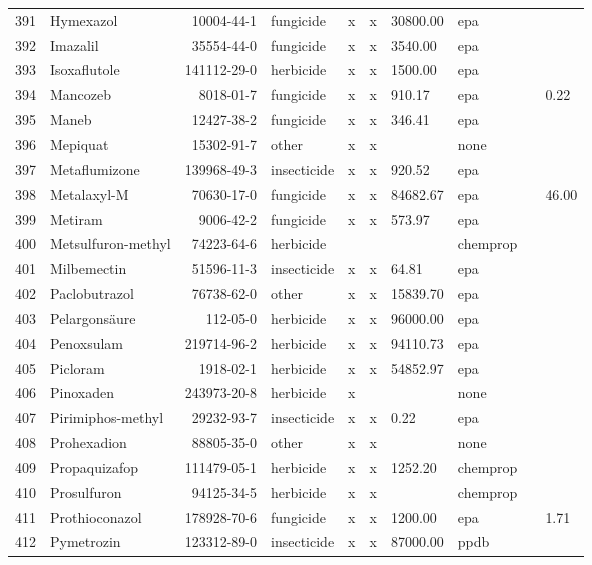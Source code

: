 \begin{longtable}{lp{3cm}rlp{0.5cm}p{0.5cm}p{1cm}p{1cm}p{1cm}p{1cm}}
  391 & Hymexazol & 10004-44-1 & fungicide & x & x & 30800.00 & epa &  &  \\ 
  392 & Imazalil & 35554-44-0 & fungicide & x & x & 3540.00 & epa &  &  \\ 
  393 & Isoxaflutole & 141112-29-0 & herbicide & x & x & 1500.00 & epa &  &  \\ 
  394 & Mancozeb & 8018-01-7 & fungicide & x & x & 910.17 & epa &  & 0.22 \\ 
  395 & Maneb & 12427-38-2 & fungicide & x & x & 346.41 & epa &  &  \\ 
  396 & Mepiquat & 15302-91-7 & other & x & x &  & none &  &  \\ 
  397 & Metaflumizone & 139968-49-3 & insecticide & x & x & 920.52 & epa &  &  \\ 
  398 & Metalaxyl-M & 70630-17-0 & fungicide & x & x & 84682.67 & epa &  & 46.00 \\ 
  399 & Metiram & 9006-42-2 & fungicide & x & x & 573.97 & epa &  &  \\ 
  400 & Metsulfuron-methyl & 74223-64-6 & herbicide &  &  &  & chemprop &  &  \\ 
  401 & Milbemectin & 51596-11-3 & insecticide & x & x & 64.81 & epa &  &  \\ 
  402 & Paclobutrazol & 76738-62-0 & other & x & x & 15839.70 & epa &  &  \\ 
  403 & Pelargonsäure & 112-05-0 & herbicide & x & x & 96000.00 & epa &  &  \\ 
  404 & Penoxsulam & 219714-96-2 & herbicide & x & x & 94110.73 & epa &  &  \\ 
  405 & Picloram & 1918-02-1 & herbicide & x & x & 54852.97 & epa &  &  \\ 
  406 & Pinoxaden & 243973-20-8 & herbicide & x &  &  & none &  &  \\ 
  407 & Pirimiphos-methyl & 29232-93-7 & insecticide & x & x & 0.22 & epa &  &  \\ 
  408 & Prohexadion & 88805-35-0 & other & x & x &  & none &  &  \\ 
  409 & Propaquizafop & 111479-05-1 & herbicide & x & x & 1252.20 & chemprop &  &  \\ 
  410 & Prosulfuron & 94125-34-5 & herbicide & x & x &  & chemprop &  &  \\ 
  411 & Prothioconazol & 178928-70-6 & fungicide & x & x & 1200.00 & epa &  & 1.71 \\ 
  412 & Pymetrozin & 123312-89-0 & insecticide & x & x & 87000.00 & ppdb &  &  \\ 

\end{longtable}
